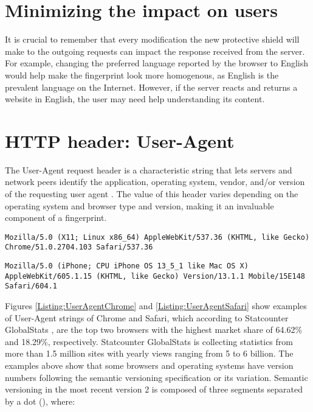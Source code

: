 \section{Minimizing the impact on users}

It is crucial to remember that every modification the new protective shield will make to the outgoing requests can impact the response received from the server. For example, changing the preferred language reported by the browser to English would help make the fingerprint look more homogenous, as English is the prevalent language on the Internet. However, if the server reacts and returns a website in English, the user may need help understanding its content.

\section{HTTP header: User-Agent}
\label{SectionHTTPHeaderUserAgent}

The User-Agent request header is a characteristic string that lets servers and network peers identify the application, operating system, vendor, and/or version of the requesting user agent \cite{MDNHeaderUserAgent}. The value of this header varies depending on the operating system and browser type and version, making it an invaluable component of a fingerprint.

\bigbreak

\begin{lstlisting}[caption={An example of Chrome User-Agent string \cite{MDNHeaderUserAgent}.}, label={Listing:UserAgentChrome}]
Mozilla/5.0 (X11; Linux x86_64) AppleWebKit/537.36 (KHTML, like Gecko) Chrome/51.0.2704.103 Safari/537.36
\end{lstlisting}

\begin{lstlisting}[caption={An example of Safari User-Agent string (mobile version) \cite{MDNHeaderUserAgent}.}, label={Listing:UserAgentSafari}]
Mozilla/5.0 (iPhone; CPU iPhone OS 13_5_1 like Mac OS X) AppleWebKit/605.1.15 (KHTML, like Gecko) Version/13.1.1 Mobile/15E148 Safari/604.1
\end{lstlisting}

\medbreak

Figures \ref{Listing:UserAgentChrome} and \ref{Listing:UserAgentSafari} show examples of User-Agent strings of Chrome and Safari, which according to Statcounter GlobalStats \cite{StatcounterGlobalStats}, are the top two browsers with the highest market share of 64.62\% and 18.29\%, respectively. Statcounter GlobalStats is collecting statistics from more than 1.5 million sites with yearly views ranging from 5 to 6 billion. The examples above show that some browsers and operating systems have version numbers following the semantic versioning specification \cite{SemVerWebsite} or its variation. Semantic versioning in the most recent version 2 is composed of three segments separated by a dot (), where:

